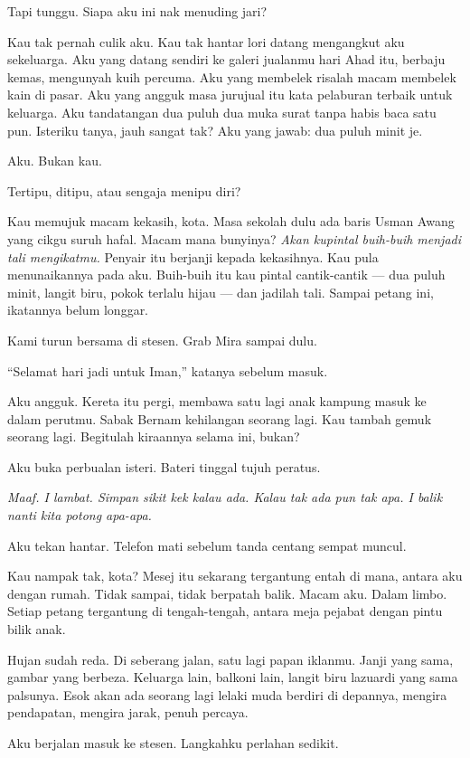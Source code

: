 \documentclass[
  11pt,
  a5paper,
  openany,
  oneside]{book}
\begin{document}
Tapi tunggu. Siapa aku ini nak menuding jari?

Kau tak pernah culik aku. Kau tak hantar lori datang mengangkut aku
sekeluarga. Aku yang datang sendiri ke galeri jualanmu hari Ahad itu,
berbaju kemas, mengunyah kuih percuma. Aku yang membelek risalah macam
membelek kain di pasar. Aku yang angguk masa jurujual itu kata pelaburan
terbaik untuk keluarga. Aku tandatangan dua puluh dua muka surat tanpa
habis baca satu pun. Isteriku tanya, jauh sangat tak? Aku yang jawab:
dua puluh minit je.

Aku. Bukan kau.

Tertipu, ditipu, atau sengaja menipu diri?

Kau memujuk macam kekasih, kota. Masa sekolah dulu ada baris Usman Awang
yang cikgu suruh hafal. Macam mana bunyinya? \emph{Akan kupintal
buih-buih menjadi tali mengikatmu.} Penyair itu berjanji kepada
kekasihnya. Kau pula menunaikannya pada aku. Buih-buih itu kau pintal
cantik-cantik --- dua puluh minit, langit biru, pokok terlalu hijau ---
dan jadilah tali. Sampai petang ini, ikatannya belum longgar.

Kami turun bersama di stesen. Grab Mira sampai dulu.

``Selamat hari jadi untuk Iman,'' katanya sebelum masuk.

Aku angguk. Kereta itu pergi, membawa satu lagi anak kampung masuk ke
dalam perutmu. Sabak Bernam kehilangan seorang lagi. Kau tambah gemuk
seorang lagi. Begitulah kiraannya selama ini, bukan?

Aku buka perbualan isteri. Bateri tinggal tujuh peratus.

\emph{Maaf. I lambat. Simpan sikit kek kalau ada. Kalau tak ada pun tak
apa. I balik nanti kita potong apa-apa.}

Aku tekan hantar. Telefon mati sebelum tanda centang sempat muncul.

Kau nampak tak, kota? Mesej itu sekarang tergantung entah di mana,
antara aku dengan rumah. Tidak sampai, tidak berpatah balik. Macam aku.
Dalam limbo. Setiap petang tergantung di tengah-tengah, antara meja
pejabat dengan pintu bilik anak.

Hujan sudah reda. Di seberang jalan, satu lagi papan iklanmu. Janji yang
sama, gambar yang berbeza. Keluarga lain, balkoni lain, langit biru
lazuardi yang sama palsunya. Esok akan ada seorang lagi lelaki muda
berdiri di depannya, mengira pendapatan, mengira jarak, penuh percaya.

Aku berjalan masuk ke stesen. Langkahku perlahan sedikit.
\end{document}
